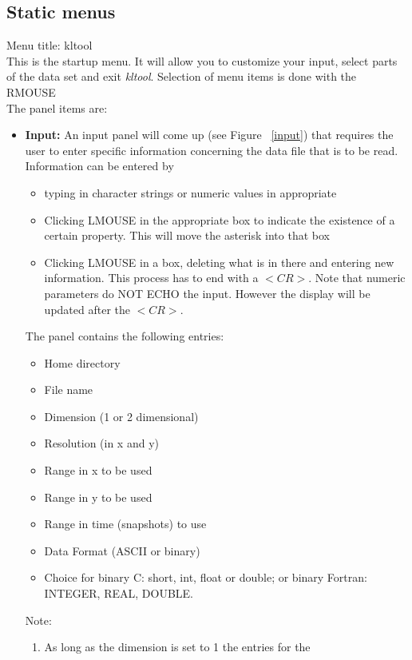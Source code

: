 \subsection{Static menus}
\label{sec:staticmenus}
\begin{description}
\item{Menu title: {\large kltool}}\\
This is the startup menu. It will allow you to customize your input,
select parts of the data set and exit {\sl kltool}. Selection of menu items
is done with the RMOUSE\\
The panel items are:
\begin{itemize}
\item {\bf Input:} 
	 An input panel will come up (see Figure ~\ref{input})
	 that requires the user
	to enter specific information concerning the data file that is to be
	read. Information can be entered by 
	\begin{itemize}
	\item typing in character strings or numeric values in appropriate
	\item Clicking LMOUSE in the appropriate box to indicate the
	existence of a certain property. This will move the asterisk into
	that box
	\item Clicking LMOUSE  in a box, deleting what is in there 
	and entering new information. This process has to end with a 
	$<CR>$. Note that numeric parameters do NOT ECHO
	the input. However the display  will be updated after the $<CR>$.
	\end{itemize}
	The panel contains the following entries:
	\begin{itemize}
	\item Home directory
	\item File name
	\item Dimension (1 or 2 dimensional)
	\item Resolution (in x and y)
	\item Range in x to be used
	\item Range in y to be used
	\item Range in time (snapshots) to use
	\item Data Format (ASCII or binary)
	\item Choice for binary C: short, int, float or double; or
	 binary Fortran:  INTEGER, REAL, DOUBLE.
	\end{itemize}
	Note:
	\begin{enumerate}
	\item As long as the dimension is set to 1 the entries for the

\end{enumerate}
\end{itemize}
\end{description}

